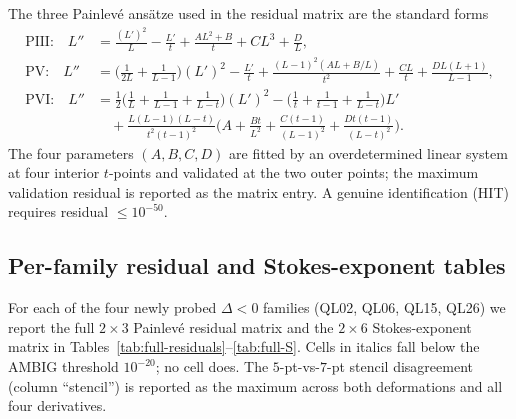 \documentclass[11pt,reqno]{amsart}
\theoremstyle{definition}
\begin{document}
The three Painlev\'e ans\"atze used in the residual matrix
are the standard forms
\begin{align*}
\text{PIII:}\quad
L'' &= \frac{(L')^{2}}{L} - \frac{L'}{t}
+ \frac{AL^{2}+B}{t} + CL^{3} + \frac{D}{L},\\
\text{PV:}\quad
L'' &= \Big(\frac{1}{2L}+\frac{1}{L-1}\Big)(L')^{2}
- \frac{L'}{t}
+ \frac{(L-1)^{2}(AL+B/L)}{t^{2}}+\frac{CL}{t}
+ \frac{DL(L+1)}{L-1},\\
\text{PVI:}\quad
L'' &= \frac{1}{2}\Big(\frac{1}{L}+\frac{1}{L-1}+\frac{1}{L-t}\Big)(L')^{2}
- \Big(\frac{1}{t}+\frac{1}{t-1}+\frac{1}{L-t}\Big)L'\\
&\quad+\frac{L(L-1)(L-t)}{t^{2}(t-1)^{2}}\Big(A
+ \frac{Bt}{L^{2}}
+ \frac{C(t-1)}{(L-1)^{2}}
+ \frac{Dt(t-1)}{(L-t)^{2}}\Big).
\end{align*}
The four parameters $(A,B,C,D)$ are fitted by an
overdetermined linear system at four interior $t$-points and
validated at the two outer points; the maximum validation
residual is reported as the matrix entry. A genuine
identification (HIT) requires residual $\le 10^{-50}$.

\subsection{Per-family residual and Stokes-exponent tables}
\label{app:perfamily}

For each of the four newly probed $\Delta<0$ families
(QL02, QL06, QL15, QL26) we report the full
$2\times 3$ Painlev\'e residual matrix and the
$2\times 6$ Stokes-exponent matrix in
Tables~\ref{tab:full-residuals}--\ref{tab:full-S}.
Cells in italics fall below the AMBIG threshold
$10^{-20}$; no cell does. The $5$-pt-vs-$7$-pt
stencil disagreement (column ``stencil'') is reported as
the maximum across both deformations and all four
derivatives.
\end{document}
